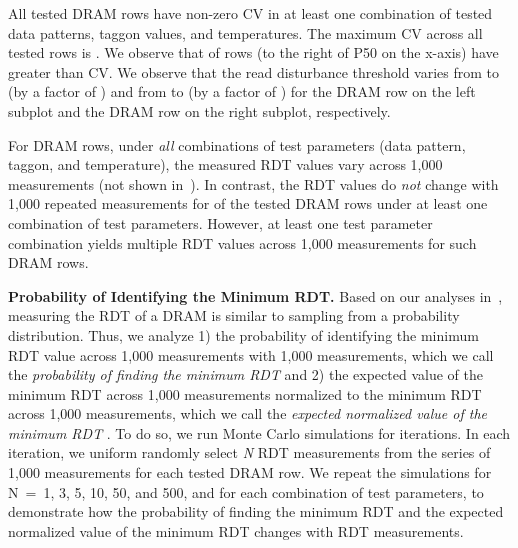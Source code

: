 \label{obs:all-rows-vary}

All tested DRAM rows have non-zero CV in at least one combination of tested data
patterns, \gls{taggon} values, and temperatures. The maximum CV across all
tested rows is . We observe that  of rows (to
the right of P50 on the x-axis) have greater than  CV. 
We observe that the read disturbance threshold varies from
 to  (by a factor of
) and from  to
 (by a factor of ) for
the DRAM row on the left subplot and the DRAM row on the right subplot,
respectively.


For  DRAM rows, under \emph{all} combinations of
test parameters (data pattern, \gls{taggon}, and temperature), the measured RDT
values vary across 1,000 measurements (not shown in~).
In contrast, the RDT values do \emph{not} change with 1,000 repeated
measurements for  of the tested DRAM rows under at least
one combination of test parameters. However, at least one test parameter
combination yields multiple RDT values across 1,000 measurements for such DRAM
rows.

\noindent
\textbf{Probability of Identifying the Minimum RDT.}
Based on our analyses in~, measuring the RDT of
a DRAM  is similar to sampling from a probability distribution.
Thus, we analyze 1) the probability of identifying the minimum RDT value
 across 1,000 measurements with  1,000
measurements, which we call the \emph{probability of finding the minimum RDT}
and 2) the expected value of the minimum RDT across  1,000
measurements normalized to the minimum RDT across 1,000 measurements, which we
call the \emph{expected
normalized value of the minimum RDT} . To do so,
we run Monte Carlo simulations for  iterations. In each iteration,
we uniform randomly select \emph{N} RDT measurements from the series
of 1,000 measurements
for each tested DRAM row. We repeat the simulations for N~=~1, 3, 5, 10, 50, and
500, and for each combination of test parameters, to demonstrate how the
probability of finding the minimum RDT and the expected normalized value of the
minimum RDT changes with  RDT measurements. 

